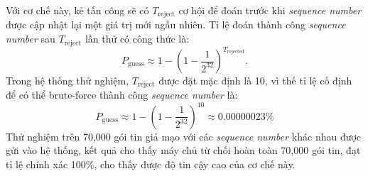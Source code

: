 Với cơ chế này, kẻ tấn công sẽ có \(T_{\text{reject}} \) cơ hội để đoán trước khi \textit{sequence number} được cập nhật lại một giá trị mới ngẫu nhiên. Tỉ lệ đoán thành công \textit{sequence number} sau \(T_{\text{reject}} \) lần thử có công thức là:
\[
P_{\text{guess}} \approx 1 - \left(1 - \frac{1}{2^{32}}\right)^{T_{\text{rejected}}}.
\]
Trong hệ thống thử nghiệm, \(T_{\text{reject}} \) được đặt mặc định là 10, vì thế tỉ lệ cố định để có thể brute-force thành công \textit{sequence number} là:
\[
P_{\text{guess}} \approx 1 - \left(1 - \frac{1}{2^{32}}\right)^{10} \approx 0.00000023 \%
\]
Thử nghiệm trên 70,000 gói tin giả mạo với các \textit{sequence number} khác nhau được gửi vào hệ thống, kết quả cho thấy máy chủ từ chối hoàn toàn 70,000 gói tin, đạt tỉ lệ chính xác 100\%, cho thấy được độ tin cậy cao của cơ chế này. 




